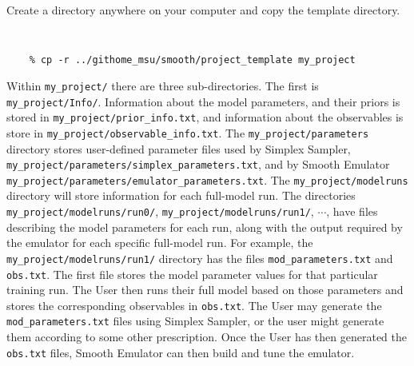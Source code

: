 \documentclass[main.tex]{subfiles}
\begin{document}
Create a directory anywhere on your computer and copy the template directory.
{\tt 
\begin{verbatim}
    % cp -r ../githome_msu/smooth/project_template my_project
\end{verbatim}
}
Within {\tt my\_project/} there are three sub-directories. The first is {\tt my\_project/Info/}. Information about the model parameters, and their priors is stored in {\tt my\_project/prior\_info.txt}, and information about the observables is store in {\tt my\_project/observable\_info.txt}. The {\tt my\_project/parameters} directory stores user-defined parameter files used by Simplex Sampler, {\tt my\_project/parameters/simplex\_parameters.txt}, and by Smooth Emulator {\tt my\_project/parameters/emulator\_parameters.txt}. The {\tt my\_project/modelruns} directory will store information for each full-model run. The directories
{\tt  my\_project/modelruns/run0/}, {\tt  my\_project/modelruns/run1/}, $\cdots$, have files describing the model parameters for each run, along with the output required by the emulator for each specific full-model run. For example, the {\tt  my\_project/modelruns/run1/} directory has the files {\tt mod\_parameters.txt} and {\tt obs.txt}. The first file stores the model parameter values for that particular training run. The User then runs their full model based on those parameters and stores the corresponding observables in {\tt obs.txt}. The User may generate the {\tt mod\_parameters.txt} files using Simplex Sampler, or the user might generate them according to some other prescription. Once the User has then generated the {\tt obs.txt} files, Smooth Emulator can then build and tune the emulator.
\end{document}
